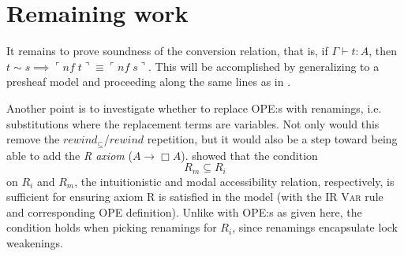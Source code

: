 \documentclass{article}
\begin{document}
\section{Remaining work}

It remains to prove soundness of the conversion relation,
that is, if $\Gamma \vdash t : A$,
then $t \sim s \implies \ulcorner \textit{nf} \; t \urcorner \equiv \ulcorner \textit{nf} \; s \urcorner$.
This will be accomplished by generalizing to a presheaf model
and proceeding along the same lines as in \cite{altenkirch95}.

Another point is to investigate whether to replace OPE:s with renamings,
i.e. substitutions where the replacement terms are variables.
Not only would this remove
the $\textit{rewind}_\subseteq$/$\textit{rewind}$ repetition,
but it would also be a step toward being able to add the \emph{R axiom}
($A \rightarrow \Box A$).
\textcite{valliappan-r} showed that the condition
$$ R_m \subseteq R_i $$
on $R_i$ and $R_m$,
the intuitionistic and modal accessibility relation, respectively,
is sufficient for ensuring axiom R is satisfied in the model
(with the IR \textsc{Var} rule and corresponding OPE definition).
Unlike with OPE:s as given here,
the condition holds when picking renamings for $R_i$,
since renamings encapsulate lock weakenings.

\printbibliography
\end{document}
